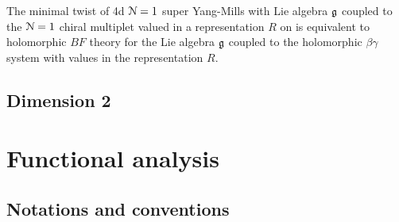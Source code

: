 \documentclass[10pt, oneside]{article}
\begin{document}
\begin{prop}
The minimal twist of 4d $\mathcal N=1$ super Yang-Mills with Lie algebra $\mathfrak g$ coupled to the $\mathcal N=1$ chiral multiplet valued in a representation $R$ on  is equivalent to holomorphic $BF$ theory for the Lie algebra $\mathfrak g$ coupled to the holomorphic $\beta\gamma$ system with values in the representation $R$. 
\end{prop}
%


\subsection{Dimension 2}



\appendix

\section{Functional analysis} \label{appx: top}

\def\CVS{{\rm CVS}}
\def\DVS{{\rm DVS}}


\subsection{Notations and conventions}
\end{document}
